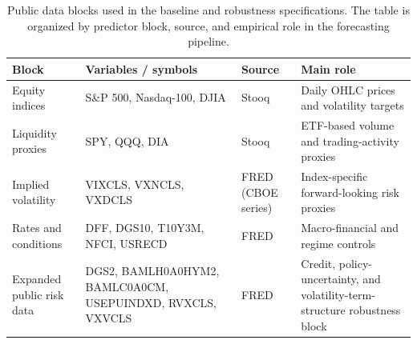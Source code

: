 \begin{table}[H]
\caption{Public data blocks used in the baseline and robustness specifications. The table is organized by predictor block, source, and empirical role in the forecasting pipeline.}
\label{tab:data_sources}
\centering
\small
\setlength{\tabcolsep}{4pt}
\renewcommand{\arraystretch}{1.15}
\begin{tabularx}{\textwidth}{>{\raggedright\arraybackslash}p{}>{\raggedright\arraybackslash}X>{\raggedright\arraybackslash}p{}>{\raggedright\arraybackslash}p{}}
\toprule
Block & Variables / symbols & Source & Main role \\
\midrule
Equity indices & S\&P 500, Nasdaq-100, DJIA & Stooq & Daily OHLC prices and volatility targets \\
Liquidity proxies & SPY, QQQ, DIA & Stooq & ETF-based volume and trading-activity proxies \\
Implied volatility & VIXCLS, VXNCLS, VXDCLS & FRED (CBOE series) & Index-specific forward-looking risk proxies \\
Rates and conditions & DFF, DGS10, T10Y3M, NFCI, USRECD & FRED & Macro-financial and regime controls \\
Expanded public risk data & DGS2, BAMLH0A0HYM2, BAMLC0A0CM, USEPUINDXD, RVXCLS, VXVCLS & FRED & Credit, policy-uncertainty, and volatility-term-structure robustness block \\
\bottomrule
\end{tabularx}
\end{table}
